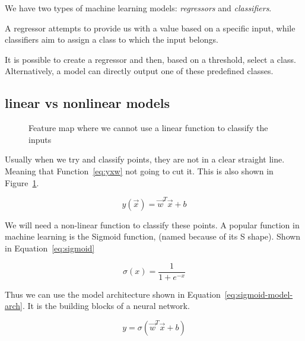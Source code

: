 \documentclass[twocolumn]{article}
\begin{document}
We have two types of machine learning models: \emph{regressors} and
\emph{classifiers}.

A regressor attempts to provide us with a value based on a specific input,
while classifiers aim to assign a class to which the input belongs.

It is possible to create a regressor and then, based on a threshold, select a
class. Alternatively, a model can directly output one of these predefined
classes.

\subsection{linear vs nonlinear models}

\begin{figure}[htbp]
  \centering
  
  \caption{Feature map where we cannot use a linear function to classify the
    inputs}
  \label{fig:nolinear}
\end{figure}

Usually when we try and classify points, they are not in a clear straight
line. Meaning that Function~\ref{eq:yxw} not going to cut it. This is also
shown in Figure~\ref{fig:nolinear}.

\begin{equation}
    y(\vec{x}) = \vec{w}^T\vec{x} + b
    \label{eq:yxw}
\end{equation}

We will need a non-linear function to classify these points. A popular
function in machine learning is the Sigmoid function, (named because of its S
shape). Shown in Equation~\ref{eq:sigmoid}

\begin{equation}
    \sigma(x) = \frac{1}{1 + e^{-x}}
    \label{eq:sigmoid}
\end{equation}

Thus we can use the model architecture shown in
Equation~\ref{eq:sigmoid-model-arch}. It is the building blocks of a neural
network.

\begin{equation}
    y = \sigma(\vec{w}^T\vec{x} + b)
    \label{eq:sigmoid-model-arch}
\end{equation}
\end{document}
